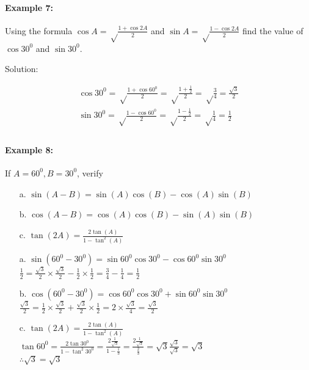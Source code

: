 \documentclass{article}
\begin{document}
\paragraph{Example 7:}
Using the formula $\cos A = \sqrt\frac{1+\cos2A}{2}$ and $\sin A = \sqrt\frac{1-\cos2A}{2}$
find the value of $\cos30^{0}$ and $\sin30^{0}$.

{\small Solution:}

\[
  \begin{aligned}
    \cos30^{0} = \sqrt\frac{1+\cos60^{0}}{2} =  \sqrt\frac{1+\frac{1}{2}}{2} = \sqrt\frac{3}{4} = \frac{\sqrt{3}}{2} \\
    \sin30^{0} = \sqrt\frac{1-\cos60^{0}}{2} =  \sqrt\frac{1-\frac{1}{2}}{2} = \sqrt\frac{1}{4} = \frac{1}{2} \\
  \end{aligned}
\]

\paragraph{Example 8:}
If $A = 60^{0}, B = 30^{0}$, verify

\begin{enumerate}
  \item[a.] $\sin(A-B) = \sin(A) \cos(B) - \cos(A) \sin(B)$
  \item[b.] $\cos(A-B) = \cos(A) \cos(B) - \sin(A) \sin(B)$
  \item[c.] $\tan(2A) = \frac{2\tan(A)}{1-\tan^{2}(A)}$
  \item[a.] $\sin(60^{0}-30^{0}) = \sin60^{0}\cos30^{0} - \cos60^{0}\sin30^{0}$ \\
        $ \frac{1}{2} = \frac{\sqrt{3}}{2} \times \frac{\sqrt{3}}{2} - \frac{1}{2} \times \frac{1}{2} = \frac{3}{4} - \frac{1}{4} = \frac{1}{2} $
  \item[b.] $\cos(60^{0}-30^{0}) = \cos60^{0}\cos30^{0} + \sin60^{0}\sin30^{0}$ \\
        $ \frac{\sqrt{3}}{2} = \frac{1}{2} \times \frac{\sqrt{3}}{2} + \frac{\sqrt{3}}{2} \times \frac{1}{2} = 2 \times \frac{\sqrt{3}}{4} = \frac{\sqrt{3}}{2}$
  \item[c.] $\tan(2A) = \frac{2\tan(A)}{1-\tan^{2}(A)}$ \\
        $ \tan 60^{0} = \frac{2\tan30^{0}}{1-\tan^{2}30^{0}} = \frac{2\frac{1}{\sqrt{3}}}{1-\frac{1}{3}} = \frac{2\frac{1}{\sqrt{3}}}{\frac{2}{3}} = \sqrt{3} \frac{\sqrt{3}}{\sqrt{3}} = \sqrt{3}$ \\
        $\therefore \sqrt{3} = \sqrt{3}$
\end{enumerate}
\end{document}
